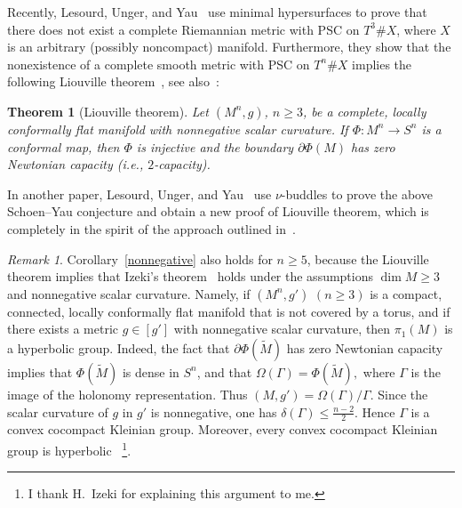 \documentclass[12pt,oneside,a4paper]{article}
\theoremstyle{mytheorem}
\newtheorem{theorem}[definition]{Theorem}
\theoremstyle{remark}
\newtheorem{remark}[definition]{Remark}
\theoremstyle{definition}
\begin{document}
Recently, Lesourd, Unger, and Yau~\cite[Theorem~1.2]{MR4836036} use minimal hypersurfaces to prove that there does not exist a complete Riemannian metric with PSC on \( T^3 \# X \), where \( X \) is an arbitrary (possibly noncompact) manifold.  
Furthermore, they show that the nonexistence of a complete smooth metric with PSC on \( T^n \# X \) implies the following Liouville theorem~\cite[Theorem~1.7]{MR4836036}, see also~\cite[Corollary~4]{zbMATH07817078}:


\begin{theorem}[Liouville theorem]\label{Liouville theorem}
Let \((M^n,g)\), \(n\geq3\), be a complete, locally conformally flat
manifold with nonnegative scalar curvature. If
\(\Phi\colon M^n\to S^n\) is a conformal map, then \(\Phi\) is injective and
the boundary \(\partial\Phi(M)\) has zero Newtonian capacity (i.e.,
$2$-capacity).
\end{theorem}

In another paper, Lesourd, Unger, and Yau~\cite[Theorem~1.2]{MR4773185} use $\nu$-buddles to prove the above Schoen–Yau conjecture and obtain a new proof of Liouville theorem, which is completely in the spirit of the approach outlined in~\cite{zbMATH04075988}.



\begin{remark}
Corollary~\ref{nonnegative} also holds for \( n \ge 5 \), because
the Liouville theorem implies that Izeki’s theorem~\cite[Theorem~3]{zbMATH01785298} 
holds under the assumptions \( \dim M \ge 3 \) and nonnegative scalar curvature.  
Namely, if \( (M^n, g') \)  \( (n\geq 3) \) is a compact, connected, locally conformally 
flat manifold that is not covered by a torus, and if there exists a metric 
\( g \in [g'] \) with nonnegative scalar curvature, then \( \pi_1(M) \) is a hyperbolic group.  Indeed, the fact that \( \partial \Phi(\widetilde M) \) has zero Newtonian capacity implies that \( \Phi(\widetilde M) \) is dense in \( S^n \), and that 
$\Omega(\Gamma) = \Phi(\widetilde M),$ where \( \Gamma \) is the image of the holonomy representation.  Thus $(M, g') = \Omega(\Gamma)/\Gamma.$
Since the scalar curvature of $g$ in \( g' \) is nonnegative, one has
$\delta(\Gamma) \le \frac{n-2}{2}.$ Hence \( \Gamma \) is a convex cocompact Kleinian group.  Moreover, every convex cocompact Kleinian group is hyperbolic~\cite[Proposition~7]{zbMATH01785298} \footnote{I thank H.~Izeki for explaining this argument to me.}.  
\end{remark}
\end{document}
